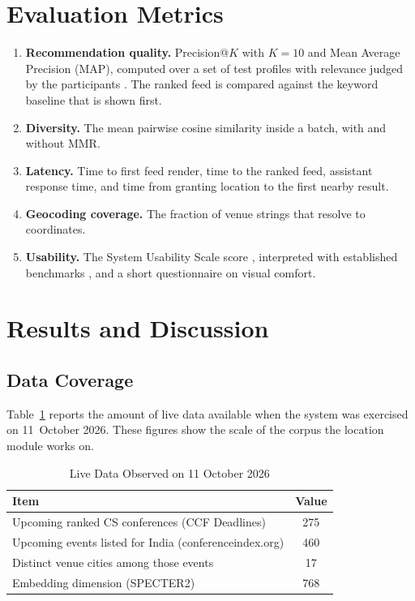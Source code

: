 \documentclass[conference]{IEEEtran}
\begin{document}
\section{Evaluation Metrics}
\begin{enumerate}
    \item \textbf{Recommendation quality.} Precision@$K$ with $K=10$ and Mean Average Precision (MAP), computed over a set of test profiles with relevance judged by the participants \cite{manning2008}. The ranked feed is compared against the keyword baseline that is shown first.
    \item \textbf{Diversity.} The mean pairwise cosine similarity inside a batch, with and without MMR.
    \item \textbf{Latency.} Time to first feed render, time to the ranked feed, assistant response time, and time from granting location to the first nearby result.
    \item \textbf{Geocoding coverage.} The fraction of venue strings that resolve to coordinates.
    \item \textbf{Usability.} The System Usability Scale score \cite{brooke1996}, interpreted with established benchmarks \cite{bangor2008}, and a short questionnaire on visual comfort.
\end{enumerate}

\section{Results and Discussion}
\subsection{Data Coverage}
Table~\ref{tab:coverage} reports the amount of live data available when the system was exercised on 11~October 2026. These figures show the scale of the corpus the location module works on.

\begin{table}[!t]
\caption{Live Data Observed on 11 October 2026}
\label{tab:coverage}
\centering
\small
\begin{tabular}{@{}lc@{}}
\toprule
\textbf{Item} & \textbf{Value} \\
\midrule
Upcoming ranked CS conferences (CCF Deadlines) & 275 \\
Upcoming events listed for India (conferenceindex.org) & 460 \\
Distinct venue cities among those events & 17 \\
Embedding dimension (SPECTER2) & 768 \\
\bottomrule
\end{tabular}
\end{table}
\end{document}
